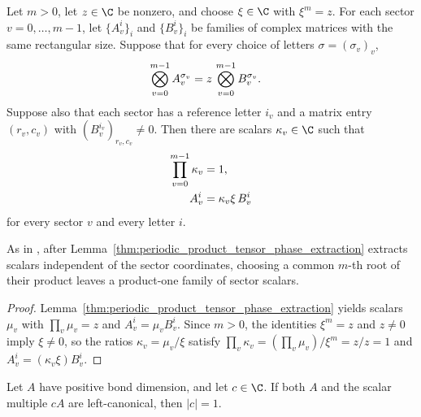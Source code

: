 \begin{lemma}
    \label{thm:periodic_product_one_phase_extraction}
    \leanok
    Let $m>0$, let $z\in\C$ be nonzero, and choose $\xi\in\C$ with
    $\xi^m=z$. For each sector $v=0,\ldots,m-1$, let $\{A_v^i\}_i$ and
    $\{B_v^i\}_i$ be families of complex matrices with the same rectangular
    size. Suppose that for every choice of letters $\sigma=(\sigma_v)_v$,
    \begin{align}
        \bigotimes_{v=0}^{m-1} A_v^{\sigma_v}
         & =
        z\,\bigotimes_{v=0}^{m-1} B_v^{\sigma_v}.
        \notag
    \end{align}
    Suppose also that each sector has a reference letter $i_v$ and a matrix
    entry $(r_v,c_v)$ with $(B_v^{i_v})_{r_v,c_v}\ne0$. Then there are scalars
    $\kappa_v\in\C$ such that
    \begin{align}
        \prod_{v=0}^{m-1}\kappa_v & =1,
        \notag                                          \\
        A_v^i                     & =\kappa_v\xi\,B_v^i
        \notag
    \end{align}
    for every sector $v$ and every letter $i$.

    As in \cite[Appendix~A, lines~1072--1080]{DeLasCuevas2017Irreducible}, after
    Lemma~\ref{thm:periodic_product_tensor_phase_extraction} extracts
    scalars independent of the sector coordinates, choosing a common $m$-th
    root of their product leaves a product-one family of sector scalars.
\end{lemma}

\begin{proof}\leanok
    Lemma~\ref{thm:periodic_product_tensor_phase_extraction} yields
    scalars $\mu_v$ with $\prod_v\mu_v=z$ and $A_v^i=\mu_vB_v^i$. Since
    $m>0$, the identities $\xi^m=z$ and $z\ne0$ imply $\xi\ne0$, so the
    ratios $\kappa_v=\mu_v/\xi$ satisfy
    $\prod_v\kappa_v=(\prod_v\mu_v)/\xi^m=z/z=1$ and
    $A_v^i=(\kappa_v\xi)B_v^i$.
\end{proof}

\begin{lemma}
    \label{thm:left_canonical_scalar_normalization}
    \leanok
    Let $A$ have positive bond dimension, and let $c\in\C$. If both $A$ and
    the scalar multiple $cA$ are left-canonical, then $|c|=1$.
\end{lemma}

